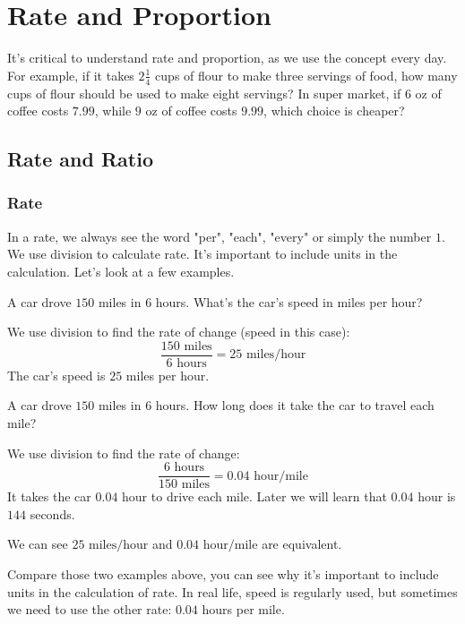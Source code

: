 

\chapter{Rate and Proportion}
\thispagestyle{fancy}

It's critical to understand rate and proportion, as we use the concept every day. For example, if it takes $2\frac{1}{4}$ cups of flour to make three servings of food, how many cups of flour should be used to make eight servings? In super market, if $6$ oz of coffee costs $7.99$, while $9$ oz of coffee costs $9.99$, which choice is cheaper?

\section{Rate and Ratio}

\subsection{Rate}
In a rate, we always see the word "per", "each", "every" or simply the number $1$. We use division to calculate rate. It's important to include units in the calculation. Let's look at a few examples.

\begin{myexample}
A car drove $150$ miles in $6$ hours. What's the car's speed in miles per hour?
\end{myexample}
\begin{solution}
We use division to find the rate of change (speed in this case):
\[ \frac{150 \text{ miles}}{6 \text{ hours}}=25 \text{ miles/hour} \]
The car's speed is $25$ miles per hour.
\end{solution}

\begin{myexample}
A car drove $150$ miles in $6$ hours. How long does it take the car to travel each mile?
\end{myexample}
\begin{solution}
We use division to find the rate of change:
\[ \frac{6 \text{ hours}}{150 \text{ miles}}=0.04 \text{ hour/mile} \]
It takes the car $0.04$ hour to drive each mile. Later we will learn that $0.04$ hour is $144$ seconds.
\end{solution}

We can see $25 \text{ miles/hour}$ and $0.04 \text{ hour/mile}$ are equivalent.

Compare those two examples above, you can see why it's important to include units in the calculation of rate. In real life, speed is regularly used, but sometimes we need to use the other rate: $0.04$ hours per mile.

